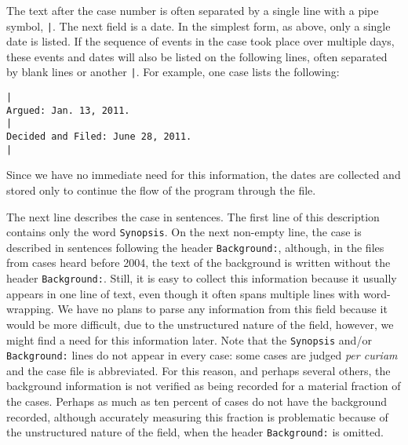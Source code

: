 \documentclass[11pt]{paper}
\begin{document}
The text after the case number is often separated by a single line with a pipe 
symbol, \texttt{|}. 
The next field is a date. 
In the simplest form, as above, only a single date is listed. 
If the sequence of events in the case took place over multiple days, these 
events and dates will also be listed on the following lines, often separated 
by blank lines or another \texttt{|}. 
For example, one case lists the following:
% 
\begin{verbatim}
|
Argued: Jan. 13, 2011.
|
Decided and Filed: June 28, 2011.
|
\end{verbatim}
% 
Since we have no immediate need for this information, the dates are collected 
and stored only to continue the flow of the program through the file. 

The next line describes the case in sentences. 
The first line of this description contains only the word \texttt{Synopsis}. 
On the next non-empty line, the case is described in sentences following the 
header \texttt{Background:}, although, in the files from cases heard before 
2004, the text of the background is written without the header 
\texttt{Background:}. 
Still, it is easy to collect this information because it usually appears in 
one line of text, even though it often spans multiple lines with word-wrapping.
We have no plans to parse any information from this field because it would be 
more difficult, due to the unstructured nature of the field, however, we might 
find a need for this information later. 
Note that the \texttt{Synopsis} and/or \texttt{Background:} lines do not 
appear in every case: some cases are judged \emph{per curiam\/} and the case 
file is abbreviated. 
For this reason, and perhaps several others, the background information is 
not verified as being recorded for a material fraction of the cases. 
Perhaps as much as ten percent of cases do not have the background recorded, 
although accurately measuring this fraction is problematic because of the 
unstructured nature of the field, when the header \texttt{Background:} is 
omitted. 
\end{document}
